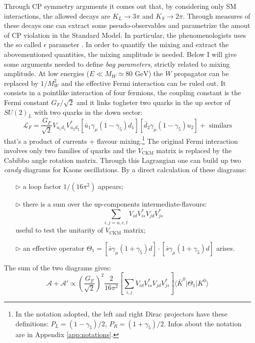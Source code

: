 \documentclass[english, LaM, oneside, noexaminfo]{sapthesis}
\newcommand{\la}{\langle}
\newcommand{\ra}{\rangle}
\newcommand{\gev}{\text{ GeV}}
\begin{document}
Through CP symmetry arguments it comes out that, by considering only SM interactions, the allowed decays are $K_L \rightarrow 3\pi$ and $K_S \rightarrow 2\pi$.
Through measures of these decays one can extract some pseudo-observables and parametrize the amout of CP violation in the Standard Model.
In particular, the phenomenologists uses the so called $\epsilon$ parameter \cite{Donoghue}.
In order to quantify the mixing and extract the abovementioned quantities, the mixing amplitude is needed.
Below I will give some arguments needed to define {\it bag parameters}, strictly related to mixing amplitude.
\newline
At low energies ($E \ll M_W \simeq 80 \gev$) the $W$ propagator can be replaced by $1/M_W^2$ and the effective Fermi interaction can be ruled out.
It consists in a pointlike interaction of four fermions, the coupling constant is the Fermi constant $G_F/\sqrt{2}$ and it links togheter two quarks in the up sector of $SU(2)_L$ with two quarks in the down sector:
\begin{equation}\label{eq:Fermi-interaction}
    \mathcal{L}_F = \frac{G_F}{\sqrt{2}} V_{u_1 d_1} V_{u_2 d_2}^* \left[\bar u_1 \gamma_\mu (1-\gamma_5)d_1\right] \left[\bar d_2 \gamma_\mu (1-\gamma_5)u_2\right] + \text{ similars}
\end{equation}
that's a product of currents + flavour mixing.\footnote{In the notation adopted, the left and right Dirac projectors have these definitions: $P_L = (1-\gamma_5)/2$, $P_R = (1+\gamma_5)/2$. Infos about the notation are in Appendix \ref{app:notations}.} 
The original Fermi interaction involves only two families of quarks and the $V_{\text{CKM}}$ matrix is replaced by the Cabibbo angle rotation matrix.
Through this Lagrangian one can build up two \textit{candy} diagrams for Kaons oscillations.
By a direct calculation of these diagrams:
\begin{itemize}
    \item [$\triangleright$] a loop factor $1/(16\pi^2)$ appears;
    \item [$\triangleright$] there is a sum over the up-components intermediate-flavours: $$\sum_{i,j=u,c,t} V_{id} V_{is}^* V_{jd} V_{js}^*$$ useful to test the unitarity of $V_\text{CKM}$ matrix;
    \item [$\triangleright$] an effective operator $\Theta_1 = \left[\bar s \gamma_\mu (1+\gamma_5) d\right] \cdot \left[ \bar s \gamma_\mu (1+\gamma_5) d \right]$ arises.
\end{itemize}
The sum of the two diagrams gives:
\begin{equation*}
    \mathcal{A} + \mathcal{A}' \propto \left(\frac{G_F}{\sqrt{2}}\right)^2 \frac{2}{16\pi^2} \left[\sum_{i,j} V_{id} V_{is}^* V_{jd} V_{js}^*\right] \la \bar K^0 | \Theta_1 | K^0 \ra
\end{equation*}
\end{document}
